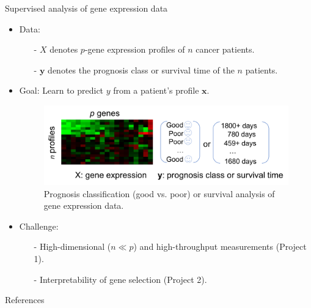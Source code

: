 \documentclass[xcolor=x11names,compress]{beamer}
\renewcommand{\(}{\begin{columns}}
\renewcommand{\)}{\end{columns}}
\newcommand{\<}[1]{\begin{column}{#1}}
\renewcommand{\>}{\end{column}}
\begin{document}
\begin{frame}{Supervised analysis of gene expression data}
	
	\begin{itemize}
		\item Data: 
		\begin{itemize}
			\item[-] $X$ denotes $p$-gene expression profiles of $n$ cancer patients.
			\item[-] $\mathbf{y}$ denotes the prognosis class or survival time of the $n$ patients.
		\end{itemize}
		
		\item Goal: Learn to predict $y$ from a patient's profile $\mathbf{x}$.
		\begin{figure}
		\begin{center}
			\includegraphics[width=0.8\linewidth]{slides/prognosis}
			\vskip -0.1in
			\caption{{\scriptsize Prognosis classification (good vs. poor) or survival analysis of gene expression data.}}
		\end{center}
		\end{figure}
		
		\item<2-> Challenge:
		\begin{itemize}
			\item[-] High-dimensional ($n \ll p$) and high-throughput measurements (Project 1).
			\item[-] Interpretability of gene selection (Project 2).
		\end{itemize}
	\end{itemize}
\end{frame}







\begin{frame}[allowframebreaks]{References}
	
	\footnotesize
	
	
	
\end{frame}
\end{document}
